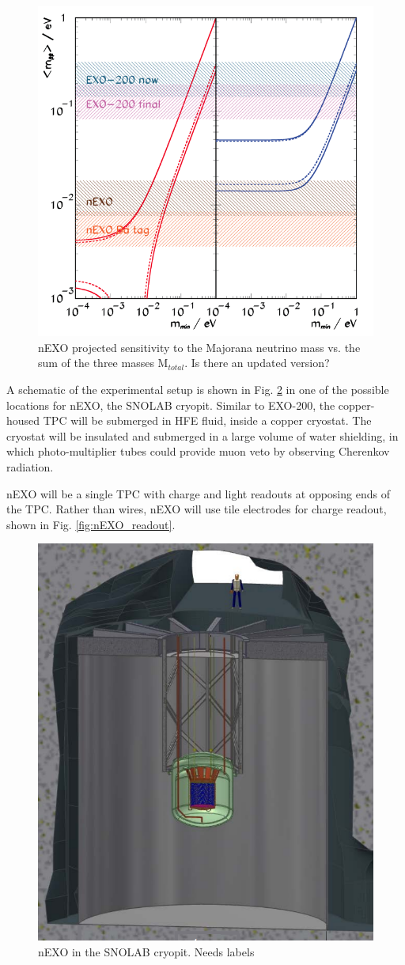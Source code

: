 \begin{figure}[H]
	\centering
	\includegraphics[width=.7\textwidth]{figures/sensitivity_v2.png}
	\caption{nEXO projected sensitivity to the Majorana neutrino mass vs. the sum of the three masses M$_{total}$. {\color{red}Is there an updated version?}}
\label{fig:sensitivity_nEXO}
\end{figure}

A schematic of the experimental setup is shown in Fig. \ref{fig:nEXO_cryopit} in one of the possible locations for nEXO, the SNOLAB cryopit.  Similar to EXO-200, the copper-housed TPC will be submerged in HFE fluid, inside a copper cryostat.  The cryostat will be insulated and submerged in a large volume of water shielding, in which photo-multiplier tubes could provide muon veto by observing Cherenkov radiation.

nEXO will be a single TPC with charge and light readouts at opposing ends of the TPC.  Rather than wires, nEXO will use tile electrodes for charge readout, shown in Fig. \ref{fig:nEXO_readout}.

\begin{figure}[H]
	\centering
	\includegraphics[width=.7\textwidth]{figures/nEXO_cryopit.png}
	\caption{nEXO in the SNOLAB cryopit. {\color{red}Needs labels}}
\label{fig:nEXO_cryopit}
\end{figure}

